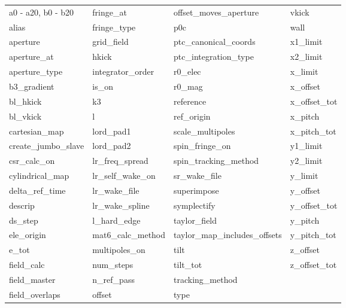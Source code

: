  \begin{tabular}{llll} \toprule
a0 - a20, b0 - b20          & fringe_at                   & offset_moves_aperture       & vkick                       \\
alias                       & fringe_type                 & p0c                         & wall                        \\
aperture                    & grid_field                  & ptc_canonical_coords        & x1_limit                    \\
aperture_at                 & hkick                       & ptc_integration_type        & x2_limit                    \\
aperture_type               & integrator_order            & r0_elec                     & x_limit                     \\
b3_gradient                 & is_on                       & r0_mag                      & x_offset                    \\
bl_hkick                    & k3                          & reference                   & x_offset_tot                \\
bl_vkick                    & l                           & ref_origin                  & x_pitch                     \\
cartesian_map               & lord_pad1                   & scale_multipoles            & x_pitch_tot                 \\
create_jumbo_slave          & lord_pad2                   & spin_fringe_on              & y1_limit                    \\
csr_calc_on                 & lr_freq_spread              & spin_tracking_method        & y2_limit                    \\
cylindrical_map             & lr_self_wake_on             & sr_wake_file                & y_limit                     \\
delta_ref_time              & lr_wake_file                & superimpose                 & y_offset                    \\
descrip                     & lr_wake_spline              & symplectify                 & y_offset_tot                \\
ds_step                     & l_hard_edge                 & taylor_field                & y_pitch                     \\
ele_origin                  & mat6_calc_method            & taylor_map_includes_offsets & y_pitch_tot                 \\
e_tot                       & multipoles_on               & tilt                        & z_offset                    \\
field_calc                  & num_steps                   & tilt_tot                    & z_offset_tot                \\
field_master                & n_ref_pass                  & tracking_method             &                             \\
field_overlaps              & offset                      & type                        &                             \\
 \bottomrule
 \end{tabular}
